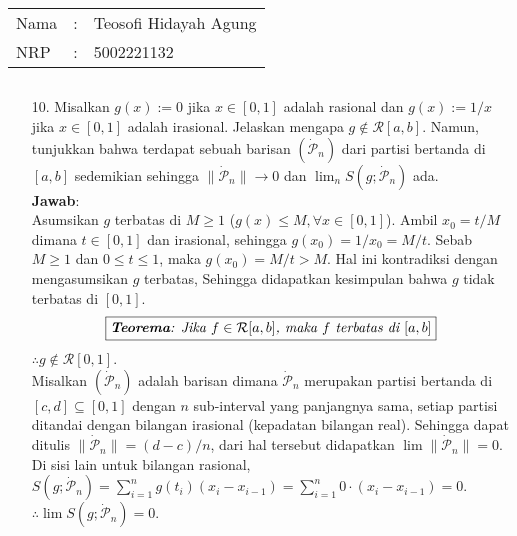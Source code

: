 \documentclass{article}
\begin{document}
    \setcounter{section}{7}
    \begin{tabular}{|lcl|}
     \hline
     Nama&:&Teosofi Hidayah Agung\\
     NRP&:&5002221132\\
     \hline
    \end{tabular}
    \subsection{}
    \begin{enumerate}
        \item[10.]Misalkan $g(x):=0$ jika $x\in[0,1]$ adalah rasional dan $g(x):=1/x$ jika $x\in[0,1]$ 
        adalah irasional. Jelaskan mengapa $g\notin\mathcal{R}[a,b]$. Namun, tunjukkan bahwa terdapat
        sebuah barisan $(\dot{\mathcal{P}}_n)$ dari partisi bertanda di $[a,b]$ sedemikian sehingga 
        $\|\dot{\mathcal{P}}_n\|\to 0$ dan $\lim_n S(g;\dot{\mathcal{P}}_n)$ ada.\\
        \textbf{Jawab}:\\
        Asumsikan $g$ terbatas di $M\ge 1$ ($g(x)\le M, \forall x\in[0,1]$). Ambil $x_0=t/M$ dimana $t\in[0,1]$ dan irasional,
        sehingga $g(x_0)=1/x_0=M/t$. Sebab $M\ge 1$ dan $0\le t\le 1$, maka $g(x_0)=M/t>M$. Hal ini kontradiksi dengan
        mengasumsikan $g$ terbatas, Sehingga didapatkan kesimpulan bahwa $g$ tidak terbatas di $[0,1]$.
        \[\fbox{\textit{\textbf{Teorema}: Jika $f\in\mathcal{R}[a,b]$, maka $f$ terbatas di $[a,b]$}}\]
        $\therefore g\notin\mathcal{R}[0,1]$.\\
        Misalkan $(\dot{\mathcal{P}}_n)$ adalah barisan dimana $\dot{\mathcal{P}}_n$ merupakan partisi bertanda di 
        $[c,d]\subseteq[0,1]$ dengan $n$ sub-interval yang panjangnya sama, setiap partisi ditandai
        dengan bilangan irasional (kepadatan bilangan real). Sehingga dapat ditulis $\|\dot{\mathcal{P}}_n\|=(d-c)/n$, 
        dari hal tersebut didapatkan $\lim\|\dot{\mathcal{P}}_n\|=0$. Di sisi lain untuk bilangan rasional, 
        $S(g;\dot{\mathcal{P}}_n)=\sum_{i=1}^{n}g(t_i)(x_i-x_{i-1})=\sum_{i=1}^{n}0\cdot(x_i-x_{i-1})=0$.\\
        $\therefore\lim S(g;\dot{\mathcal{P}}_n)=0$.


\end{enumerate}
\end{document}
